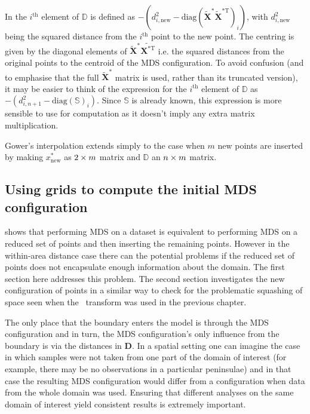 In  the $i^\text{th}$ element of $\mathbb{D}$ is defined as $-(d^2_{i,\text{new}}-\text{diag}(\mathbf{\tilde{X}}^* \mathbf{\tilde{X}}^{*\text{T}})_i)$, with $d^2_{i,\text{new}}$ being the squared distance from the $i^\text{th}$ point to the new point. The centring is given by the diagonal elements of $\tilde{\mathbf{X}}^*\tilde{\mathbf{X}^{* \text{T}}}$ i.e. the squared distances from the original points to the centroid of the MDS configuration. To avoid confusion (and to emphasise that the full $\tilde{\mathbf{X}}^*$ matrix is used, rather than its truncated version), it may be easier to think of the expression for the $i^\text{th}$ element of $\mathbb{D}$ as $-(d^2_{i,n+1}-\text{diag}(\mathbb{S})_i)$. Since $\mathbb{S}$ is already known, this expression is more sensible to use for computation as it doesn't imply any extra matrix multiplication.

Gower's interpolation extends simply to the case when $m$ new points are inserted by making $x^*_{\text{new}}$ as $2 \times m$ matrix and $\mathbb{D}$ an $n \times m$ matrix.


\subsection{Using grids to compute the initial MDS configuration}

 shows that performing MDS on a dataset is equivalent to performing MDS on a reduced set of points and then inserting the remaining points. However in the within-area distance case there can the potential problems if the reduced set of points does not encapsulate enough information about the domain. The first section here addresses this problem. The second section investigates the new configuration of points in a similar way to check for the problematic squashing of space seen when the \sch\ transform was used in the previous chapter.

\label{grids}

The only place that the boundary enters the model is through the MDS configuration and in turn, the MDS configuration's only influence from the boundary is via the distances in $\mathbf{D}$. In a spatial setting one can imagine the case in which samples were not taken from one part of the domain of interest (for example, there may be no observations in a particular peninsulae) and in that case the resulting MDS configuration would differ from a configuration when data from the whole domain was used. Ensuring that different analyses on the same domain of interest yield consistent results is extremely important.

